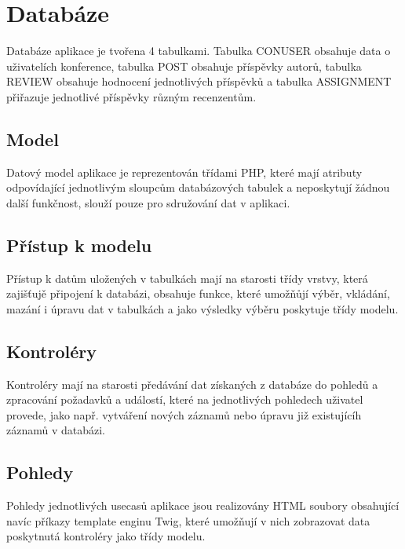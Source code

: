 \documentclass[12pt, a4paper]{article}
\begin{document}
\section{Databáze}
\par Databáze aplikace je tvořena 4 tabulkami. Tabulka CONUSER obsahuje data o uživatelích konference, tabulka POST obsahuje příspěvky autorů,
tabulka REVIEW obsahuje hodnocení jednotlivých příspěvků a tabulka ASSIGNMENT přiřazuje jednotlivé příspěvky různým recenzentům.

\subsection{Model}
\par Datový model aplikace je reprezentován třídami PHP, které mají atributy odpovídající jednotlivým sloupcům
databázových tabulek a neposkytují žádnou další funkčnost, slouží pouze pro sdružování dat v aplikaci.

\subsection{Přístup k modelu}
\par Přístup k datům uložených v tabulkách mají na starosti třídy vrstvy, která zajišťujě připojení k databázi,
obsahuje funkce, které umožňůjí výběr, vkládání, mazání i úpravu dat v tabulkách a jako výsledky výběru poskytuje třídy modelu.

\subsection{Kontroléry}
\par Kontroléry mají na starosti předávání dat získaných z databáze do pohledů a zpracování požadavků a událostí,
které na jednotlivých pohledech uživatel provede, jako např. vytváření nových záznamů nebo úpravu již existujícíh
záznamů v databázi.

\subsection{Pohledy}
\par Pohledy jednotlivých usecasů aplikace jsou realizovány HTML soubory obsahující navíc příkazy template enginu Twig,
které umožňují v nich zobrazovat data poskytnutá kontroléry jako třídy modelu.
\end{document}

